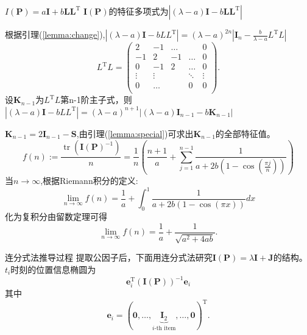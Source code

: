 \documentclass[notheorems,xetex]{beamer}
\DeclareMathOperator{\tr}{tr}
\theoremstyle{definition}
\begin{document}
\begin{frame}[noframenumbering]{$I(\bm{P})=a\bm{I}+b \bm{L}\bm{L}^{\textrm{T}}$}
$\bm{I}(\bm{P})$的特征多项式为$|(\lambda-a)\bm{I}-b\bm{L}\bm{L}^{\textrm{T}}|$
\pause

根据引理(\ref{lemma:change}),$|(\lambda-a)\bm{I}-bLL^{\textrm{T}}|=(\lambda-a)^{2n}|\bm{I}_n-\frac{b}{\lambda-a}L^{\textrm{T}}L|$
\[L^{\textrm{T}}L=\left(
\begin{array}{ccccc}
2&-1&\dots&&0\\
-1&2&-1&\dots&0\\
0&-1&2&\dots&0\\
\vdots &\vdots&&\ddots &\vdots\\
0&\dots&&0&0\\
\end{array}
\right).
\]
\pause
设$\bm{K}_{n-1}$为$L^{\textrm{T}}L$第n-1阶主子式，则
$|(\lambda-a)\bm{I}-bLL^{\textrm{T}}|=(\lambda-a)^{n+1}|(\lambda-a)\bm{I}_{n-1}-b\bm{K}_{n-1}|$
\end{frame}
\begin{frame}[noframenumbering]
$\bm{K}_{n-1}=2\bm{I}_{n-1}-\bm{S}$,由引理(\ref{lemma:special})可求出$\bm{K}_{n-1}$的全部特征值。
\pause
\[
f(n):=\frac{\tr(\bm{I}(\bm{P})^{-1})}{n}=\frac{1}{n}\left(\frac{n+1}{a}+\sum_{j=1}^{n-1}\frac{1}{a+2b(1-\cos(\frac{\pi j}{n}))}\right)
\]
当$n\to \infty$,根据Riemann积分的定义:
\[
\lim_{n\rightarrow \infty}f(n)=\frac{1}{a}+\int_0^1 \frac{1}{a+2b(1-\cos(\pi x))}dx
\]
化为复积分由留数定理可得
\[
\lim_{n\rightarrow \infty}f(n)=\frac{1}{a}+\frac{1}{\sqrt{a^2+4ab}}.
\]
\end{frame}
\begin{frame}[noframenumbering]{连分式法推导过程}
提取公因子后，下面用连分式法研究$\bm{I}(\bm{P})=\lambda \bm{I}+\bm{J}$的结构。
\pause
$t_{i}$时刻的位置信息椭圆为
\[
\bm{e}_{i}^{\textrm{T}}(\bm{I}(\bm{P}))^{-1}\bm{e}_{i}
\]
其中
\begin{equation*}
\bm{e}_i=(\bm{0},\dots,\underbrace{\bm{I}_2}_{i\text{-th item}},\dots,\bm{0})^{\textrm{T}}.
\end{equation*}
\end{frame}
\end{document}
